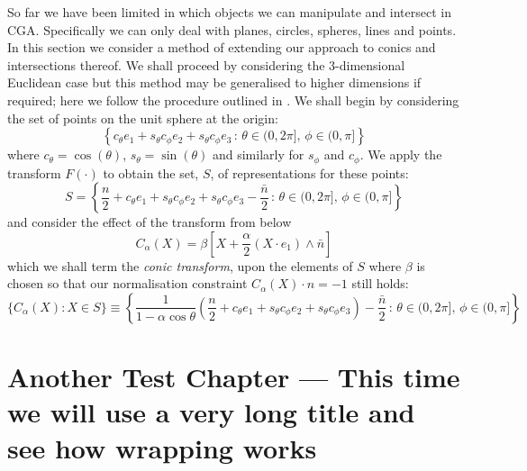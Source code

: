 So far we have been limited in which objects we can manipulate and intersect
in CGA. Specifically we can only deal with planes, circles, spheres, lines and
points. In this section we consider a method of extending our approach to
conics and intersections thereof. We shall proceed by considering the 
3-dimensional Euclidean case but this method may be generalised to higher
dimensions if required; here we follow the procedure outlined in
\cite{anthonyChina}.
We shall begin by considering the set of points on the unit sphere at the 
origin:
\[
\left\{ c_\theta e_1 + s_\theta c_\phi e_2 + s_\theta c_\phi e_3\,:\,
	\theta \in (0,2\pi],\,\phi \in (0,\pi] \right\}
\]
where $c_\theta = \cos(\theta)$, $s_\theta = \sin(\theta)$ and similarly
for $s_\phi$ and $c_\phi$. We apply the transform $F(\cdot)$ to
obtain the set, $S$, of representations for these points:
\[
S = \left\{ \frac{n}{2} + c_\theta e_1 + s_\theta c_\phi e_2
+ s_\theta c_\phi e_3 -
    \frac{\bar{n}}{2} \,:\,
	\theta \in (0,2\pi],\,\phi \in (0,\pi] \right\}
\]
and consider the effect of the transform from \cite{anthonyChina} below 
\[
C_\alpha(X) = \beta \left[ X + \frac{\alpha}{2} (X \cdot e_1) \wedge \bar{n} \right]
\]
which we shall term the \emph{conic transform}, upon the elements of $S$ 
where $\beta$ is chosen so that our normalisation constraint
$C_\alpha(X) \cdot n = -1$ still holds:
\[
\{ C_\alpha(X) : X \in S \} \equiv \left\{ \frac{1}{1 - \alpha \cos \theta} \left(
	\frac{n}{2} + c_\theta e_1 + s_\theta c_\phi e_2 
              + s_\theta c_\phi e_3 \right) -
    \frac{\bar{n}}{2} \,:\,
	\theta \in (0,2\pi],\,\phi \in (0,\pi] \right\}
\]

\chapter{Another Test Chapter --- This time we will use a very long title
and see how wrapping works}

